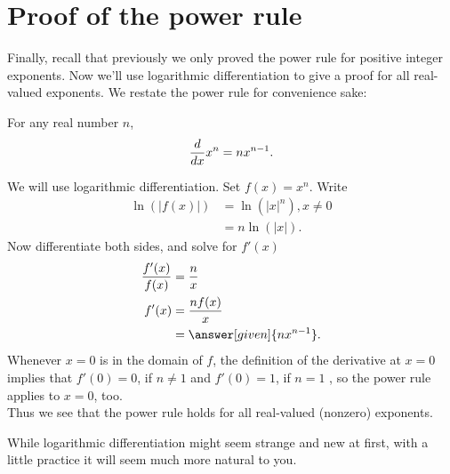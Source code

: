 \documentclass{ximera}
\begin{document}
	
	\section{Proof of the power rule}
	
	
	Finally, recall that previously we only proved the power rule for
	positive integer exponents. Now we'll use logarithmic differentiation to give
	a proof for all real-valued exponents. We restate the power rule
	for convenience sake:
	
	\begin{theorem}
		For any  real number $n$, 
		\[
		\frac{d}{\mathop{}\!d x} x^n = n x^{n-1}.
		\]
		\begin{explanation}
			
			We will use logarithmic differentiation. Set $f(x) = x^n$. Write
			\begin{align*}
				\ln(|f(x)|) &= \ln\left(|x|^n\right) , x\ne0\\ 
				&= n\ln(|x|).
			\end{align*}
			Now differentiate both sides, and solve for $f'(x)$
			\begin{align*}
				\frac{f'(x)}{f(x)} &= \frac{n}{x}\\
				f'(x) &=\frac{n f(x)}{x}\\
				&= \answer[given]{n x^{n-1}}.
			\end{align*}
			Whenever $x=0$ is in the domain of $f$, the definition of the derivative at $x=0$ implies that  $f'(0)=0$, if $n\ne1$ and $f'(0)=1$, if $n=1$ , so the power rule applies to $x=0$, too.\\
			
			Thus we see that the power rule holds for all real-valued (nonzero) exponents.
		\end{explanation}
	\end{theorem}
	
	While logarithmic differentiation might seem strange and new at
	first, with a little practice it will seem much more natural to you.
	
\end{document}
